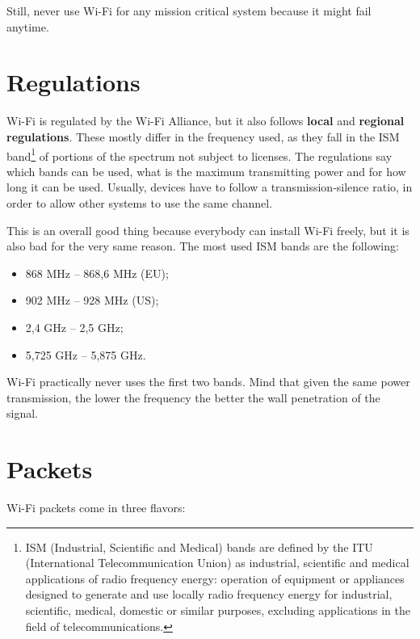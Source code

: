 Still, never use Wi-Fi for any mission critical system because it might fail anytime.


\section{Regulations}
Wi-Fi is regulated by the Wi-Fi Alliance, but it also follows \textbf{local} and \textbf{regional regulations}. These mostly differ in the frequency used, as they fall in the ISM band\footnote{ISM (Industrial, Scientific and Medical) bands are defined by the ITU (International Telecommunication Union) as industrial, scientific and medical applications of radio frequency energy: operation of equipment or appliances designed to generate and use locally radio frequency energy for industrial, scientific, medical, domestic or similar purposes, excluding applications in the field of telecommunications.} of portions of the spectrum not subject to licenses. The regulations say which bands can be used, what is the maximum transmitting power and for how long it can be used. Usually, devices have to follow a transmission-silence ratio, in order to allow other systems to use the same channel.

This is an overall good thing because everybody can install Wi-Fi freely, but it is also bad for the very same reason. The most used ISM bands are the following:

\begin{itemize}
    \item 868 MHz – 868,6 MHz (EU);
    \item 902 MHz – 928 MHz (US);
    \item 2,4 GHz – 2,5 GHz;
    \item 5,725 GHz – 5,875 GHz.
\end{itemize}

Wi-Fi practically never uses the first two bands. Mind that given the same power transmission, the lower the frequency the better the wall penetration of the signal.


\section{Packets}
Wi-Fi packets come in three flavors:

